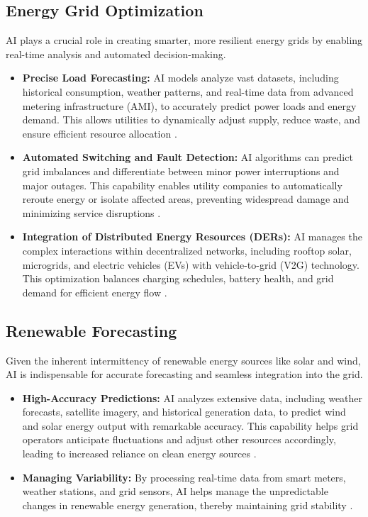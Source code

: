 \subsection{Energy Grid Optimization}
AI plays a crucial role in creating smarter, more resilient energy grids by enabling real-time analysis and automated decision-making.
\begin{itemize}
    \item \textbf{Precise Load Forecasting:} AI models analyze vast datasets, including historical consumption, weather patterns, and real-time data from advanced metering infrastructure (AMI), to accurately predict power loads and energy demand. This allows utilities to dynamically adjust supply, reduce waste, and ensure efficient resource allocation \cite{SAP_EnergyAI, TribeAI_EnergyAI}.
    \item \textbf{Automated Switching and Fault Detection:} AI algorithms can predict grid imbalances and differentiate between minor power interruptions and major outages. This capability enables utility companies to automatically reroute energy or isolate affected areas, preventing widespread damage and minimizing service disruptions \cite{SAP_EnergyAI, FDMGroup_EnergyAI}.
    \item \textbf{Integration of Distributed Energy Resources (DERs):} AI manages the complex interactions within decentralized networks, including rooftop solar, microgrids, and electric vehicles (EVs) with vehicle-to-grid (V2G) technology. This optimization balances charging schedules, battery health, and grid demand for efficient energy flow \cite{Cyient_EnergyAI}.
\end{itemize}

\subsection{Renewable Forecasting}
Given the inherent intermittency of renewable energy sources like solar and wind, AI is indispensable for accurate forecasting and seamless integration into the grid.
\begin{itemize}
    \item \textbf{High-Accuracy Predictions:} AI analyzes extensive data, including weather forecasts, satellite imagery, and historical generation data, to predict wind and solar energy output with remarkable accuracy. This capability helps grid operators anticipate fluctuations and adjust other resources accordingly, leading to increased reliance on clean energy sources \cite{Zealousys_EnergyAI, BiomassProducer_EnergyAI}.
    \item \textbf{Managing Variability:} By processing real-time data from smart meters, weather stations, and grid sensors, AI helps manage the unpredictable changes in renewable energy generation, thereby maintaining grid stability \cite{Zealousys_EnergyAI, Logic2020_EnergyAI}.
\end{itemize}

